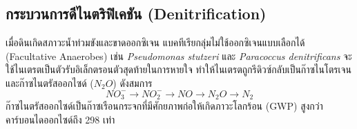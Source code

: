 \subsection{กระบวนการดีไนตริฟิเคชัน (Denitrification)}
เมื่อดินเกิดสภาวะน้ำท่วมขังและขาดออกซิเจน แบคทีเรียกลุ่มไม่ใช้ออกซิเจนแบบเลือกได้ (Facultative Anaerobes) เช่น \textit{Pseudomonas stutzeri} และ \textit{Paracoccus denitrificans} จะใช้ไนเตรตเป็นตัวรับอิเล็กตรอนตัวสุดท้ายในการหายใจ ทำให้ไนเตรตถูกรีดิวซ์กลับเป็นก๊าซไนโตรเจนและก๊าซไนตรัสออกไซด์ ($N_2O$) ดังสมการ
\begin{equation}
NO_3^- \to NO_2^- \to NO \to N_2O \to N_2
\end{equation}
ก๊าซไนตรัสออกไซด์เป็นก๊าซเรือนกระจกที่มีศักยภาพก่อให้เกิดภาวะโลกร้อน (GWP) สูงกว่าคาร์บอนไดออกไซด์ถึง 298 เท่า

